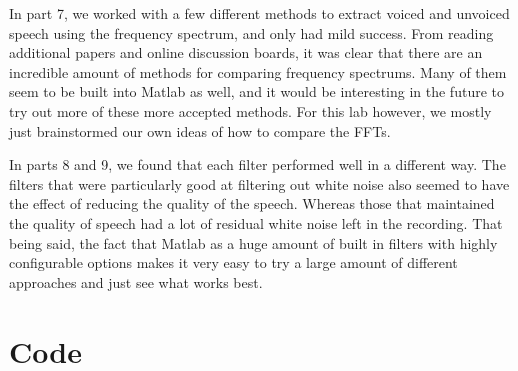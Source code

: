 \documentclass[11pt]{article}
\begin{document}
In part 7, we worked with a few different methods to extract voiced and unvoiced speech using the frequency spectrum, and only had mild success. From reading additional papers and online discussion boards, it was clear that there are an incredible amount of methods for comparing frequency spectrums. Many of them seem to be built into Matlab as well, and it would be interesting in the future to try out more of these more accepted methods. For this lab however, we mostly just brainstormed our own ideas of how to compare the FFTs.

In parts 8 and 9, we found that each filter performed well in a different way. The filters that were particularly good at filtering out white noise also seemed to have the effect of reducing the quality of the speech. Whereas those that maintained the quality of speech had a lot of residual white noise left in the recording. That being said, the fact that Matlab as a huge amount of built in filters with highly configurable options makes it very easy to try a large amount of different approaches and just see what works best. 


%
%
%
%
%
\section{Code}
\end{document}
